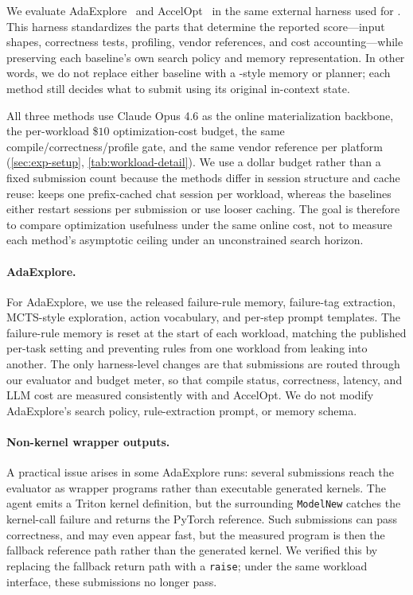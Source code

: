 We evaluate AdaExplore~\citep{adaexplore} and AccelOpt~\citep{accelopt} in the same external harness used for \sys. This harness standardizes the parts that determine the reported score---input shapes, correctness tests, profiling, vendor references, and cost accounting---while preserving each baseline's own search policy and memory representation. In other words, we do not replace either baseline with a \sys-style memory or planner; each method still decides what to submit using its original in-context state.

All three methods use Claude Opus 4.6 as the online materialization backbone, the per-workload \$$10$ optimization-cost budget, the same compile/correctness/profile gate, and the same vendor reference per platform (\autoref{sec:exp-setup}, \autoref{tab:workload-detail}). We use a dollar budget rather than a fixed submission count because the methods differ in session structure and cache reuse: \sys keeps one prefix-cached chat session per workload, whereas the baselines either restart sessions per submission or use looser caching. The goal is therefore to compare optimization usefulness under the same online cost, not to measure each method's asymptotic ceiling under an unconstrained search horizon.

\paragraph{AdaExplore.}
For AdaExplore, we use the released failure-rule memory, failure-tag extraction, MCTS-style exploration, action vocabulary, and per-step prompt templates. The failure-rule memory is reset at the start of each workload, matching the published per-task setting and preventing rules from one workload from leaking into another. The only harness-level changes are that submissions are routed through our evaluator and budget meter, so that compile status, correctness, latency, and LLM cost are measured consistently with \sys and AccelOpt. We do not modify AdaExplore's search policy, rule-extraction prompt, or memory schema.

\paragraph{Non-kernel wrapper outputs.}
A practical issue arises in some AdaExplore runs: several submissions reach the evaluator as wrapper programs rather than executable generated kernels. The agent emits a Triton kernel definition, but the surrounding \texttt{ModelNew} catches the kernel-call failure and returns the PyTorch reference. Such submissions can pass correctness, and may even appear fast, but the measured program is then the fallback reference path rather than the generated kernel. We verified this by replacing the fallback return path with a \texttt{raise}; under the same workload interface, these submissions no longer pass.

